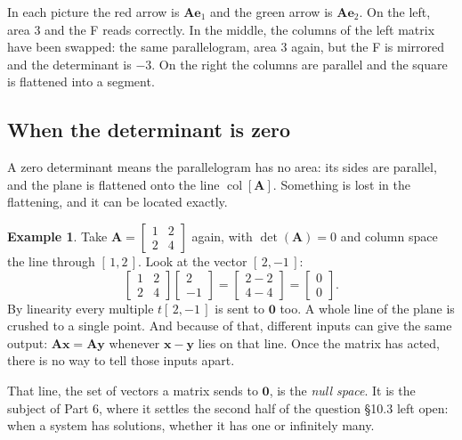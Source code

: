\documentclass[11pt]{article}
\theoremstyle{plain}
\theoremstyle{definition}
\newtheorem{ex}{Example}[section]
\theoremstyle{remark}
\newcommand{\vc}[1]{\mathbf{#1}}        %
\newcommand{\mt}[1]{\mathbf{#1}}        %
\newcommand{\colsp}[1]{\operatorname{col}[#1]}
\begin{document}
\noindent In each picture the red arrow is $\mt{A}\vc{e}_1$ and the green arrow
is $\mt{A}\vc{e}_2$. On the left, area $3$ and the F reads correctly. In the
middle, the columns of the left matrix have been swapped: the same parallelogram,
area $3$ again, but the F is mirrored and the determinant is $-3$. On the right
the columns are parallel and the square is flattened into a segment.

\subsection{When the determinant is zero}
A zero determinant means the parallelogram has no area: its sides are parallel,
and the plane is flattened onto the line $\colsp{\mt{A}}$. Something is lost
in the flattening, and it can be located exactly.

\begin{ex}
Take $\mt{A}=\begin{bmatrix}1&2\\2&4\end{bmatrix}$ again, with
$\det(\mt{A})=0$ and column space the line through $[\,1,2\,]$. Look at the
vector $[\,2,-1\,]$:
\[
  \begin{bmatrix}1&2\\2&4\end{bmatrix}
  \begin{bmatrix}2\\-1\end{bmatrix}
  =\begin{bmatrix}2-2\\4-4\end{bmatrix}
  =\begin{bmatrix}0\\0\end{bmatrix}.
\]
By linearity every multiple $t[\,2,-1\,]$ is sent to $\vc{0}$ too. A whole line
of the plane is crushed to a single point. And because of that, different
inputs can give the same output: $\mt{A}\vc{x}=\mt{A}\vc{y}$ whenever
$\vc{x}-\vc{y}$ lies on that line. Once the matrix has acted, there is no way
to tell those inputs apart.
\end{ex}

\noindent That line, the set of vectors a matrix sends to $\vc{0}$, is the
\emph{null space}. It is the subject of Part 6, where it settles the second
half of the question \S10.3 left open: when a system has solutions, whether it
has one or infinitely many.
\end{document}
